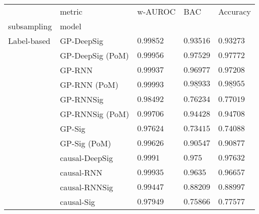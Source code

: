 \begin{tabular}{lllll}
\toprule
       & metric &                               w-AUROC &                                   BAC &                              Accuracy \\
subsampling & model &                                       &                                       &                                       \\
\midrule
Label-based & GP-DeepSig &                           $ 0.99852 $ &                           $ 0.93516 $ &                           $ 0.93273 $ \\
       & GP-DeepSig (PoM) &                           $ 0.99956 $ &                           $ 0.97529 $ &                           $ 0.97772 $ \\
       & GP-RNN &                           $ 0.99937 $ &                           $ 0.96977 $ &                           $ 0.97208 $ \\
       & GP-RNN (PoM) &               $  \mathbf{ 0.99993 } $ &            $  \underline{ 0.98933 } $ &            $  \underline{ 0.98955 } $ \\
       & GP-RNNSig &                           $ 0.98492 $ &                           $ 0.76234 $ &                           $ 0.77019 $ \\
       & GP-RNNSig (PoM) &                           $ 0.99706 $ &                           $ 0.94428 $ &                           $ 0.94708 $ \\
       & GP-Sig &                           $ 0.97624 $ &                           $ 0.73415 $ &                           $ 0.74088 $ \\
       & GP-Sig (PoM) &                           $ 0.99626 $ &                           $ 0.90547 $ &                           $ 0.90877 $ \\
       & causal-DeepSig &                            $ 0.9991 $ &                             $ 0.975 $ &                           $ 0.97632 $ \\
       & causal-RNN &                           $ 0.99935 $ &                            $ 0.9635 $ &                           $ 0.96657 $ \\
       & causal-RNNSig &                           $ 0.99447 $ &                           $ 0.88209 $ &                           $ 0.88997 $ \\
       & causal-Sig &                           $ 0.97949 $ &                           $ 0.75866 $ &                           $ 0.77577 $ \\

\end{tabular}
